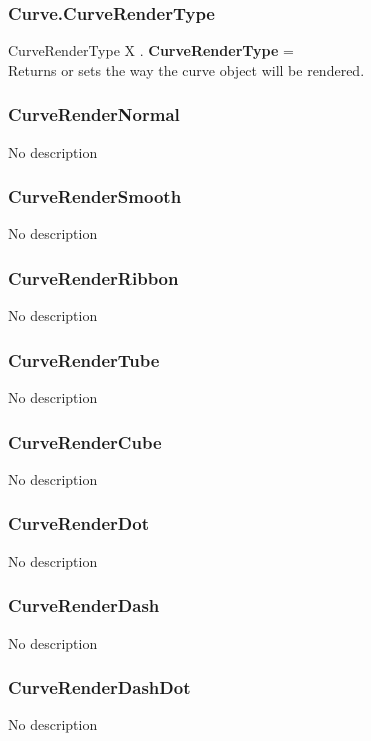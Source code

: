 \documentclass[10pt]{book}
\begin{document}
\subsubsection{Curve.CurveRenderType \label{F:Curve:CurveRenderType}}
CurveRenderType X . \textbf{CurveRenderType} = \\
Returns or sets the way the curve object will be rendered.

\subsubsection{CurveRenderNormal \label{T:CurveRenderType|CurveRenderNormal}}
No description

\subsubsection{CurveRenderSmooth \label{T:CurveRenderType|CurveRenderSmooth}}
No description

\subsubsection{CurveRenderRibbon \label{T:CurveRenderType|CurveRenderRibbon}}
No description

\subsubsection{CurveRenderTube \label{T:CurveRenderType|CurveRenderTube}}
No description

\subsubsection{CurveRenderCube \label{T:CurveRenderType|CurveRenderCube}}
No description

\subsubsection{CurveRenderDot \label{T:CurveRenderType|CurveRenderDot}}
No description

\subsubsection{CurveRenderDash \label{T:CurveRenderType|CurveRenderDash}}
No description

\subsubsection{CurveRenderDashDot \label{T:CurveRenderType|CurveRenderDashDot}}
No description
\end{document}
